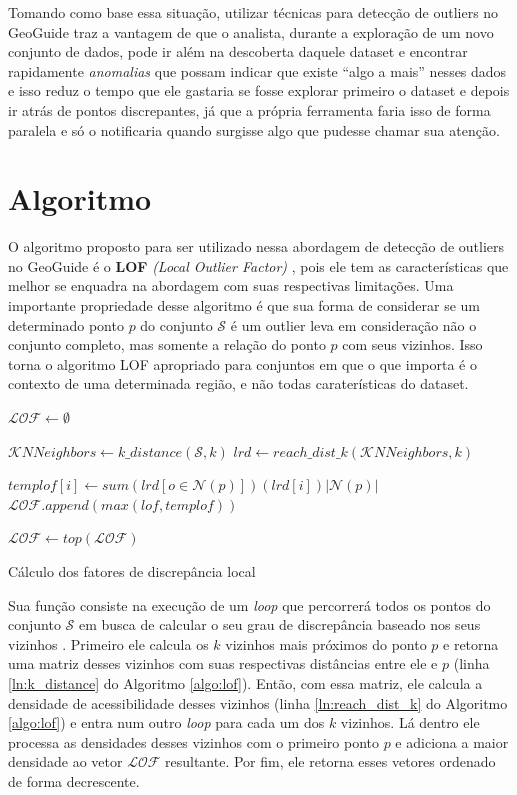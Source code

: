 Tomando como base essa situação, utilizar técnicas para detecção de outliers no GeoGuide traz a vantagem de que o analista, durante a exploração de um novo conjunto de dados, pode ir além na descoberta daquele dataset e encontrar rapidamente \textit{anomalias} que possam indicar que existe ``algo a mais'' nesses dados e isso reduz o tempo que ele gastaria se fosse explorar primeiro o dataset e depois ir atrás de pontos discrepantes, já que a própria ferramenta faria isso de forma paralela e só o notificaria quando surgisse algo que pudesse chamar sua atenção.

\section{Algoritmo}

O algoritmo proposto para ser utilizado nessa abordagem de detecção de outliers no GeoGuide \cite{omidvarTehrani2017} é o \textbf{LOF} \textit{(Local Outlier Factor)} \cite{Breunig:2000:LID:335191.335388}, pois ele tem as características que melhor se enquadra na abordagem com suas respectivas limitações. Uma importante propriedade desse algoritmo é que sua forma de considerar se um determinado ponto $p$ do conjunto $\mathcal{S}$ é um outlier leva em consideração não o conjunto completo, mas somente a relação do ponto $p$ com seus vizinhos. Isso torna o algoritmo LOF apropriado para conjuntos em que o que importa é o contexto de uma determinada região, e não todas caraterísticas do dataset.

\begin{algorithm}[!h]
	\DontPrintSemicolon
	$\mathcal{LOF} \gets \emptyset$\;
	{
		$\mathcal{K}NNeighbors \gets \mathit{k\_distance}(\mathcal{S}, k)$\label{ln:k_distance}\;
		$lrd \gets \mathit{reach\_dist\_k}(\mathcal{K}NNeighbors, k)$\label{ln:reach_dist_k}\;

		{
			$templof[i] \gets sum(lrd[o \in \mathcal{N} (p)])(lrd[i])|\mathcal{N}(p)|$\;
			$\mathcal{LOF}.append(max(lof, templof))$\;
		}
	}
	$\mathcal{LOF} \gets top(\mathcal{LOF})$\;
	\;  
	\caption{Cálculo dos fatores de discrepância local}
	\label{algo:lof}
\end{algorithm}

Sua função consiste na execução de um \textit{loop} que percorrerá todos os pontos do conjunto $\mathcal{S}$ em busca de calcular o seu grau de discrepância baseado nos seus vizinhos \cite{DBLP:conf:AlshawabkehJK10}. Primeiro ele calcula os $k$ vizinhos mais próximos do ponto $p$ e retorna uma matriz desses vizinhos com suas respectivas distâncias entre ele e $p$ (linha \ref{ln:k_distance} do Algoritmo \ref{algo:lof}). Então, com essa matriz, ele calcula a densidade de acessibilidade desses vizinhos (linha \ref{ln:reach_dist_k} do Algoritmo \ref{algo:lof}) e entra num outro \textit{loop} para cada um dos $k$ vizinhos. Lá dentro ele processa as densidades desses vizinhos com o primeiro ponto $p$ e adiciona a maior densidade ao vetor $\mathcal{LOF}$ resultante. Por fim, ele retorna esses vetores ordenado de forma decrescente. 

